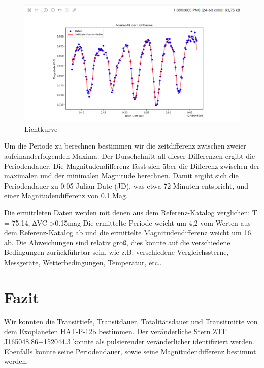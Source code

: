 \documentclass[ngerman,ruledheaders=section,class=report,thesis={type=Protokoll},accentcolor=1b,marginpar=false,parskip=half-,fontsize=11pt,]{tudapub}
\begin{document}
	\begin{figure}[h]
		\centering
		\includegraphics[width=0.8\linewidth]{LK_Fit}
		\caption{Lichtkurve}
		\label{Abbildung 4.44}
	\end{figure}

Um die Periode zu berechnen bestimmen wir die zeitdifferenz zwischen zweier aufeinanderfolgenden Maxima. Der Durschchnitt all dieser Differenzen ergibt die Periodendauer.
Die Magnitudendifferenz lässt sich über die Differenz zwischen der maximalen und der minimalen Magnitude berechnen.
Damit ergibt sich die Periodendauer zu 0.05 Julian Date (JD), was etwa 72 Minuten entspricht, und einer Magnitudendifferenz von 0.1 Mag.

Die ermittleten Daten werden mit denen aus dem Referenz-Katalog verglichen: T = 75.14, ∆VC >0.15mag
 Die ermittelte Periode weicht um 4,2 vom Werten aus dem Referenz-Katalog ab und die ermittelte
 Magnitudendifferenz weicht um 16 ab. Die Abweichungen sind relativ groß, dies könnte auf die verschiedene Bedingungen zurückführbar sein, wie z.B: verschiedene Vergleichssterne, Messgeräte, Wetterbedingungen, Temperatur, etc..


	\chapter{Fazit}
	Wir konnten die Transittiefe, Transitdauer, Totalitätsdauer und Transitmitte von dem Exoplaneten HAT-P-12b bestimmen.
Der veränderliche Stern ZTF J165048.86+152044.3 konnte als pulsierender veränderlicher identifiziert werden. Ebenfalls konnte seine Periodendauer, sowie seine Magnitudendifferenz bestimmt werden.

	
	
	\printbibliography
	
	
\end{document}
